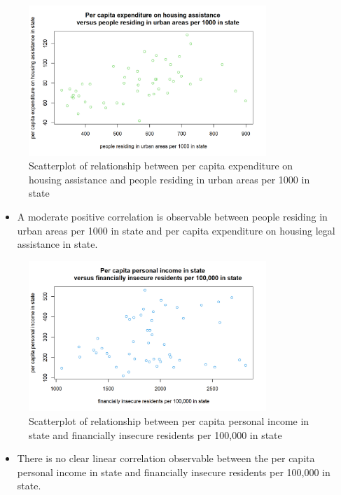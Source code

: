\documentclass[12pt,letterpaper]{article}
\begin{document}
\newpage

\begin{figure}[H]
	\caption{Scatterplot of relationship between per capita expenditure on housing assistance and people residing in urban areas per 1000 in state}
	\centering
	\includegraphics[width=0.8\textwidth]{Figure_1_3.png}
\end{figure}

\begin{itemize}
	\item 
A moderate positive correlation is observable between people residing in urban areas per 1000 in state and per capita expenditure on housing legal assistance in state. 
\end{itemize}

\newpage

\begin{figure}[H]
	\caption{Scatterplot of relationship between per capita personal income in state and financially insecure residents per 100,000 in state}
	\centering
	\includegraphics[width=0.8\textwidth]{Figure_1_4.png}
\end{figure}

\begin{itemize}
	\item 
There is no clear linear correlation observable between the per capita personal income in state and financially insecure residents per 100,000 in state. 
\end{itemize}
\end{document}
